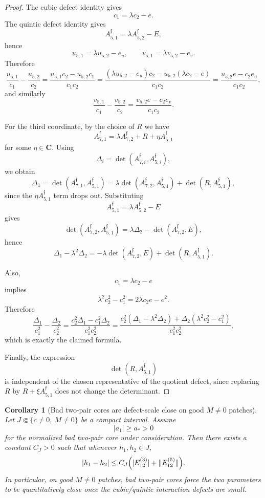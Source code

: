 \documentclass[11pt,a4paper]{amsart}
\theoremstyle{plain}
\newtheorem{corollary}[theorem]{Corollary}
\theoremstyle{definition}
\begin{document}
\begin{proof}
The cubic defect identity gives
\[
c_1=\lambda c_2-e.
\]
The quintic defect identity gives
\[
A_{5,1}^{\mathfrak f}=\lambda A_{5,2}^{\mathfrak f}-E,
\]
hence
\[
u_{5,1}=\lambda u_{5,2}-e_u,
\qquad
v_{5,1}=\lambda v_{5,2}-e_v.
\]
Therefore
\[
\frac{u_{5,1}}{c_1}-\frac{u_{5,2}}{c_2}
=
\frac{u_{5,1}c_2-u_{5,2}c_1}{c_1c_2}
=
\frac{(\lambda u_{5,2}-e_u)c_2-u_{5,2}(\lambda c_2-e)}{c_1c_2}
=
\frac{u_{5,2}e-c_2e_u}{c_1c_2},
\]
and similarly
\[
\frac{v_{5,1}}{c_1}-\frac{v_{5,2}}{c_2}
=
\frac{v_{5,2}e-c_2e_v}{c_1c_2}.
\]

For the third coordinate, by the choice of $R$ we have
\[
A_{7,1}^{\mathfrak f}
=
\lambda A_{7,2}^{\mathfrak f}
+
R
+
\eta A_{5,1}^{\mathfrak f}
\]
for some $\eta\in\mathbf C$. Using
\[
\Delta_i=\det(A_{7,i}^{\mathfrak f},A_{5,i}^{\mathfrak f}),
\]
we obtain
\[
\Delta_1
=
\det(A_{7,1}^{\mathfrak f},A_{5,1}^{\mathfrak f})
=
\lambda\det(A_{7,2}^{\mathfrak f},A_{5,1}^{\mathfrak f})
+
\det(R,A_{5,1}^{\mathfrak f}),
\]
since the $\eta A_{5,1}^{\mathfrak f}$ term drops out. Substituting
\[
A_{5,1}^{\mathfrak f}=\lambda A_{5,2}^{\mathfrak f}-E
\]
gives
\[
\det(A_{7,2}^{\mathfrak f},A_{5,1}^{\mathfrak f})
=
\lambda\Delta_2-\det(A_{7,2}^{\mathfrak f},E),
\]
hence
\[
\Delta_1-\lambda^2\Delta_2
=
-\lambda\det(A_{7,2}^{\mathfrak f},E)
+
\det(R,A_{5,1}^{\mathfrak f}).
\]

Also,
\[
c_1=\lambda c_2-e
\]
implies
\[
\lambda^2c_2^2-c_1^2=2\lambda c_2 e-e^2.
\]
Therefore
\[
\frac{\Delta_1}{c_1^2}-\frac{\Delta_2}{c_2^2}
=
\frac{c_2^2\Delta_1-c_1^2\Delta_2}{c_1^2c_2^2}
=
\frac{
c_2^2(\Delta_1-\lambda^2\Delta_2)+\Delta_2(\lambda^2c_2^2-c_1^2)
}{c_1^2c_2^2},
\]
which is exactly the claimed formula.

Finally, the expression
\[
\det(R,A_{5,1}^{\mathfrak f})
\]
is independent of the chosen representative of the quotient defect, since
replacing $R$ by $R+\xi A_{5,1}^{\mathfrak f}$ does not change the
determinant.
\end{proof}

\begin{corollary}[Bad two-pair cores are defect-scale close on good $M\neq 0$ patches]
\label{cor:bad-two-pair-cores-defect-scale-close}
Let $J\Subset\{c\neq 0,\ M\neq 0\}$ be a compact interval. Assume
\[
|a_1|\ge a_*>0
\]
for the normalized bad two-pair core under consideration. Then there exists a
constant $C_J>0$ such that whenever $h_1,h_2\in J$,
\[
|h_1-h_2|
\le
C_J\Bigl(|E_{12}^{(3)}|+\|E_{12}^{(5)}\|\Bigr).
\]
In particular, on good $M\neq 0$ patches, bad two-pair cores force the two
parameters to be quantitatively close once the cubic/quintic interaction
defects are small.
\end{corollary}
\end{document}
